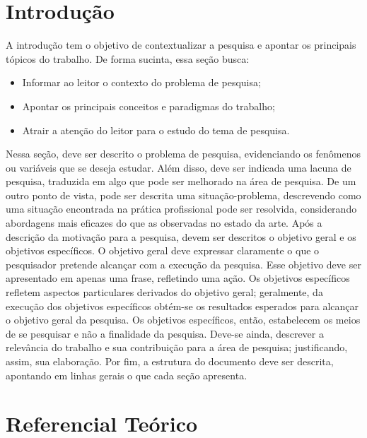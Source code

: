\documentclass[
	article,			%
	11pt,				%
	oneside,			%
	a4paper,			%
	english,			%
	brazil,				%
	sumario=tradicional
	]{abntex2}
\begin{document}

\textual

\section{Introdução}
A introdução tem o objetivo de contextualizar a pesquisa e apontar os principais tópicos do trabalho. De forma sucinta, essa seção busca:

\begin{itemize}
\item Informar ao leitor o contexto do problema de pesquisa;
\item Apontar os principais conceitos e paradigmas do trabalho;
\item Atrair a atenção do leitor para o estudo do tema de pesquisa.
\end{itemize}

Nessa seção, deve ser descrito o problema de pesquisa, evidenciando os fenômenos ou variáveis que se deseja estudar. Além disso, deve ser indicada uma lacuna de pesquisa, traduzida em algo que pode ser melhorado na área de pesquisa. De um outro ponto de vista, pode ser descrita uma situação-problema, descrevendo como uma situação encontrada na prática profissional pode ser resolvida, considerando abordagens mais eficazes do que as observadas no estado da arte.
Após a descrição da motivação para a pesquisa, devem ser descritos o objetivo geral e os objetivos específicos. O objetivo geral deve expressar claramente o que o pesquisador pretende alcançar com a execução da pesquisa. Esse objetivo deve ser apresentado em apenas uma frase, refletindo uma ação. Os objetivos específicos refletem aspectos particulares derivados do objetivo geral; geralmente, da execução dos objetivos específicos obtém-se os resultados esperados para alcançar o objetivo geral da pesquisa. Os objetivos específicos, então, estabelecem os meios de se pesquisar e não a finalidade da pesquisa.
Deve-se ainda, descrever a relevância do trabalho e sua contribuição para a área de pesquisa; justificando, assim, sua elaboração.
Por fim, a estrutura do documento deve ser descrita, apontando em linhas gerais o que cada seção apresenta.


\section{Referencial Teórico}
\end{document}
